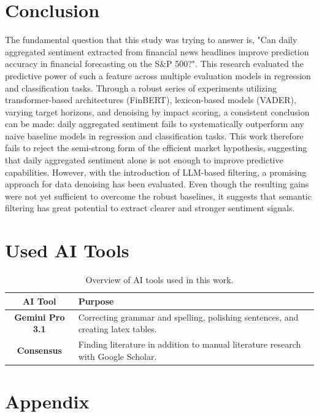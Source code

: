 \documentclass[Master,english,IEEE]{twbook}
\begin{document}
\chapter{Conclusion}
The fundamental question that this study was trying to answer is, "Can daily aggregated sentiment extracted from financial news headlines improve prediction accuracy in financial forecasting on the S\&P 500?". This research evaluated the predictive power of such a feature across multiple evaluation models in regression and classification tasks. Through a robust series of experiments utilizing transformer-based architectures (FinBERT), lexicon-based models (VADER), varying target horizons, and denoising by impact scoring, a consistent conclusion can be made: daily aggregated sentiment fails to systematically outperform any naive baseline models in regression and classification tasks. This work therefore fails to reject the semi-strong form of the efficient market hypothesis, suggesting that daily aggregated sentiment alone is not enough to improve predictive capabilities. However, with the introduction of LLM-based filtering, a promising approach for data denoising has been evaluated. Even though the resulting gains were not yet sufficient to overcome the robust baselines, it suggests that semantic filtering has great potential to extract clearer and stronger sentiment signals.

\chapter{Used AI Tools}
\begin{table}[h]
    \centering
    \begin{tabular}{|c|p{10cm}|}
        \hline
        \textbf{AI Tool} & \textbf{Purpose} \\
        \hline
        \textbf{Gemini Pro 3.1} & Correcting grammar and spelling, polishing sentences, and creating latex tables. \\
        \hline
        \textbf{Consensus} & Finding literature in addition to manual literature research with Google Scholar. \\
        \hline
   \end{tabular}
    \caption{Overview of AI tools used in this work.}
    \label{tab:ai_tools}
\end{table}

\chapter{Appendix}
\end{document}
